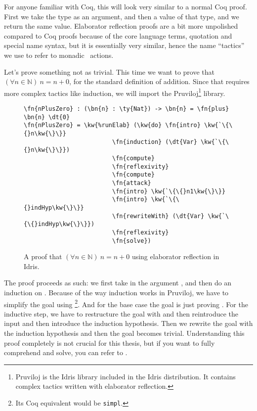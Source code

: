 For anyone familiar with Coq, this will look very similar to a normal Coq
proof. First we take the type as an argument, and then a value of that type,
and we return the same value. Elaborator reflection proofs are a bit more
unpolished compared to Coq proofs because of the core language terms,
quotation and special name syntax, but it is essentially very similar,
hence the name ``tactics'' we use to refer to monadic \Elab\ actions.

Let's prove something not as trivial. This time we want to prove that
$(\forall n \in \mathbb{N})\ n = n + 0$, for the standard definition of
addition. Since that requires more complex tactics like induction, we will
import the Pruviloj\footnote{Pruviloj is the Idris library included in
the Idris distribution. It contains complex tactics written with elaborator
reflection.} library.\cite{davidphd}

\begin{figure}[ht]
  \caption{A proof that $(\forall n \in \mathbb{N})\ n = n + 0$ using elaborator reflection in Idris.}
\begin{Verbatim}[framesep=2mm, label=\footnotesize{\normalfont{Idris}}, labelposition=topline]
\fn{nPlusZero} : (\bn{n} : \ty{Nat}) -> \bn{n} = \fn{plus} \bn{n} \dt{0}
\fn{nPlusZero} = \kw{%runElab} (\kw{do} \fn{intro} \kw{`\{\{}n\kw{\}\}}
                         \fn{induction} (\dt{Var} \kw{`\{\{}n\kw{\}\}})
                         \fn{compute}
                         \fn{reflexivity}
                         \fn{compute}
                         \fn{attack}
                         \fn{intro} \kw{`\{\{}n1\kw{\}\}}
                         \fn{intro} \kw{`\{\{}indHyp\kw{\}\}}
                         \fn{rewriteWith} (\dt{Var} \kw{`\{\{}indHyp\kw{\}\}})
                         \fn{reflexivity}
                         \fn{solve})
\end{Verbatim}
\end{figure}

The proof proceeds as such: we first take in the argument , and then do
an induction on . Because of the way induction works in Pruviloj, we have
to simplify the goal using \footnote{Its Coq equivalent would be
\texttt{simpl}.}.
And for the base case the goal is just proving  \dt{=} .
For the inductive step, we have to restructure the goal with  and
then reintroduce the input and then introduce the induction hypothesis. Then we
rewrite the goal with the induction hypothesis and then the goal becomes
trivial. Understanding this proof completely is not crucial for this thesis,
but if you want to fully comprehend  and {solve}, you can refer to
\cite{elabref}.

